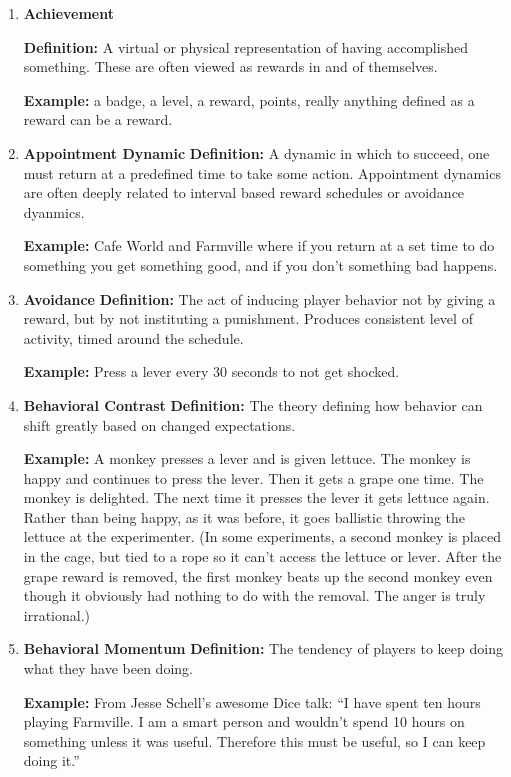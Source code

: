 \begin{enumerate}
\item \textbf{Achievement}

\textbf{Definition:} A virtual or physical representation of having accomplished something. These are often viewed as rewards in and of themselves.

\textbf{Example:} a badge, a level, a reward, points, really anything defined as a reward can be a reward.

\item \textbf{Appointment Dynamic}
\textbf{Definition:} A dynamic in which to succeed, one must return at a predefined time to take some action. Appointment dynamics are often deeply related to interval based reward schedules or avoidance dyanmics.

\textbf{Example:} Cafe World and Farmville where if you return at a set time to do something you get something good, and if you don’t something bad happens.

\item \textbf{Avoidance}
\textbf{Definition:} The act of inducing player behavior not by giving a reward, but by not instituting a punishment. Produces consistent level of activity, timed around the schedule.

\textbf{Example:} Press a lever every 30 seconds to not get shocked.

\item \textbf{Behavioral Contrast}
\textbf{Definition:} The theory defining how behavior can shift greatly based on changed expectations.

\textbf{Example:} A monkey presses a lever and is given lettuce. The monkey is happy and continues to press the lever. Then it gets a grape one time. The monkey is delighted. The next time it presses the lever it gets lettuce again. Rather than being happy, as it was before, it goes ballistic throwing the lettuce at the experimenter. (In some experiments, a second monkey is placed in the cage, but tied to a rope so it can’t access the lettuce or lever. After the grape reward is removed, the first monkey beats up the second monkey even though it obviously had nothing to do with the removal. The anger is truly irrational.)

\item \textbf{Behavioral Momentum}
\textbf{Definition:} The tendency of players to keep doing what they have been doing.

\textbf{Example:} From Jesse Schell's awesome Dice talk: “I have spent ten hours playing Farmville. I am a smart person and wouldn’t spend 10 hours on something unless it was useful. Therefore this must be useful, so I can keep doing it.”


\end{enumerate}
